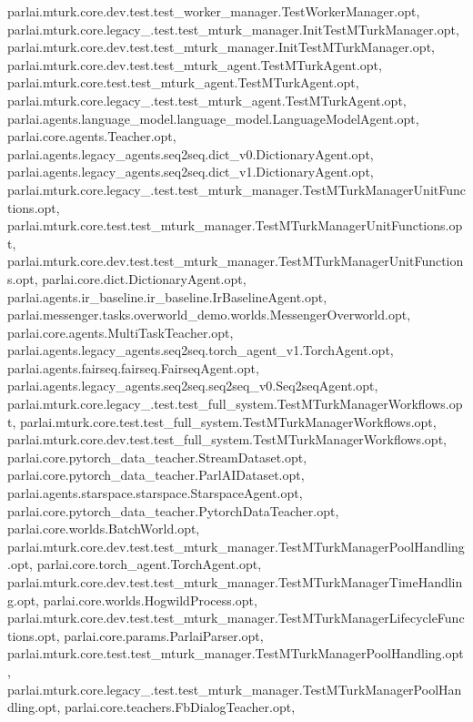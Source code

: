 parlai.\+mturk.\+core.\+dev.\+test.\+test\+\_\+worker\+\_\+manager.\+Test\+Worker\+Manager.\+opt, parlai.\+mturk.\+core.\+legacy\+\_.\+test.\+test\+\_\+mturk\+\_\+manager.\+Init\+Test\+M\+Turk\+Manager.\+opt, parlai.\+mturk.\+core.\+dev.\+test.\+test\+\_\+mturk\+\_\+manager.\+Init\+Test\+M\+Turk\+Manager.\+opt, parlai.\+mturk.\+core.\+dev.\+test.\+test\+\_\+mturk\+\_\+agent.\+Test\+M\+Turk\+Agent.\+opt, parlai.\+mturk.\+core.\+test.\+test\+\_\+mturk\+\_\+agent.\+Test\+M\+Turk\+Agent.\+opt, parlai.\+mturk.\+core.\+legacy\+\_.\+test.\+test\+\_\+mturk\+\_\+agent.\+Test\+M\+Turk\+Agent.\+opt, parlai.\+agents.\+language\+\_\+model.\+language\+\_\+model.\+Language\+Model\+Agent.\+opt, parlai.\+core.\+agents.\+Teacher.\+opt, parlai.\+agents.\+legacy\+\_\+agents.\+seq2seq.\+dict\+\_\+v0.\+Dictionary\+Agent.\+opt, parlai.\+agents.\+legacy\+\_\+agents.\+seq2seq.\+dict\+\_\+v1.\+Dictionary\+Agent.\+opt, parlai.\+mturk.\+core.\+legacy\+\_.\+test.\+test\+\_\+mturk\+\_\+manager.\+Test\+M\+Turk\+Manager\+Unit\+Functions.\+opt, parlai.\+mturk.\+core.\+test.\+test\+\_\+mturk\+\_\+manager.\+Test\+M\+Turk\+Manager\+Unit\+Functions.\+opt, parlai.\+mturk.\+core.\+dev.\+test.\+test\+\_\+mturk\+\_\+manager.\+Test\+M\+Turk\+Manager\+Unit\+Functions.\+opt, parlai.\+core.\+dict.\+Dictionary\+Agent.\+opt, parlai.\+agents.\+ir\+\_\+baseline.\+ir\+\_\+baseline.\+Ir\+Baseline\+Agent.\+opt, parlai.\+messenger.\+tasks.\+overworld\+\_\+demo.\+worlds.\+Messenger\+Overworld.\+opt, parlai.\+core.\+agents.\+Multi\+Task\+Teacher.\+opt, parlai.\+agents.\+legacy\+\_\+agents.\+seq2seq.\+torch\+\_\+agent\+\_\+v1.\+Torch\+Agent.\+opt, parlai.\+agents.\+fairseq.\+fairseq.\+Fairseq\+Agent.\+opt, parlai.\+agents.\+legacy\+\_\+agents.\+seq2seq.\+seq2seq\+\_\+v0.\+Seq2seq\+Agent.\+opt, parlai.\+mturk.\+core.\+legacy\+\_.\+test.\+test\+\_\+full\+\_\+system.\+Test\+M\+Turk\+Manager\+Workflows.\+opt, parlai.\+mturk.\+core.\+test.\+test\+\_\+full\+\_\+system.\+Test\+M\+Turk\+Manager\+Workflows.\+opt, parlai.\+mturk.\+core.\+dev.\+test.\+test\+\_\+full\+\_\+system.\+Test\+M\+Turk\+Manager\+Workflows.\+opt, parlai.\+core.\+pytorch\+\_\+data\+\_\+teacher.\+Stream\+Dataset.\+opt, parlai.\+core.\+pytorch\+\_\+data\+\_\+teacher.\+Parl\+A\+I\+Dataset.\+opt, parlai.\+agents.\+starspace.\+starspace.\+Starspace\+Agent.\+opt, parlai.\+core.\+pytorch\+\_\+data\+\_\+teacher.\+Pytorch\+Data\+Teacher.\+opt, parlai.\+core.\+worlds.\+Batch\+World.\+opt, parlai.\+mturk.\+core.\+dev.\+test.\+test\+\_\+mturk\+\_\+manager.\+Test\+M\+Turk\+Manager\+Pool\+Handling.\+opt, parlai.\+core.\+torch\+\_\+agent.\+Torch\+Agent.\+opt, parlai.\+mturk.\+core.\+dev.\+test.\+test\+\_\+mturk\+\_\+manager.\+Test\+M\+Turk\+Manager\+Time\+Handling.\+opt, parlai.\+core.\+worlds.\+Hogwild\+Process.\+opt, parlai.\+mturk.\+core.\+dev.\+test.\+test\+\_\+mturk\+\_\+manager.\+Test\+M\+Turk\+Manager\+Lifecycle\+Functions.\+opt, parlai.\+core.\+params.\+Parlai\+Parser.\+opt, parlai.\+mturk.\+core.\+test.\+test\+\_\+mturk\+\_\+manager.\+Test\+M\+Turk\+Manager\+Pool\+Handling.\+opt, parlai.\+mturk.\+core.\+legacy\+\_.\+test.\+test\+\_\+mturk\+\_\+manager.\+Test\+M\+Turk\+Manager\+Pool\+Handling.\+opt, parlai.\+core.\+teachers.\+Fb\+Dialog\+Teacher.\+opt, 